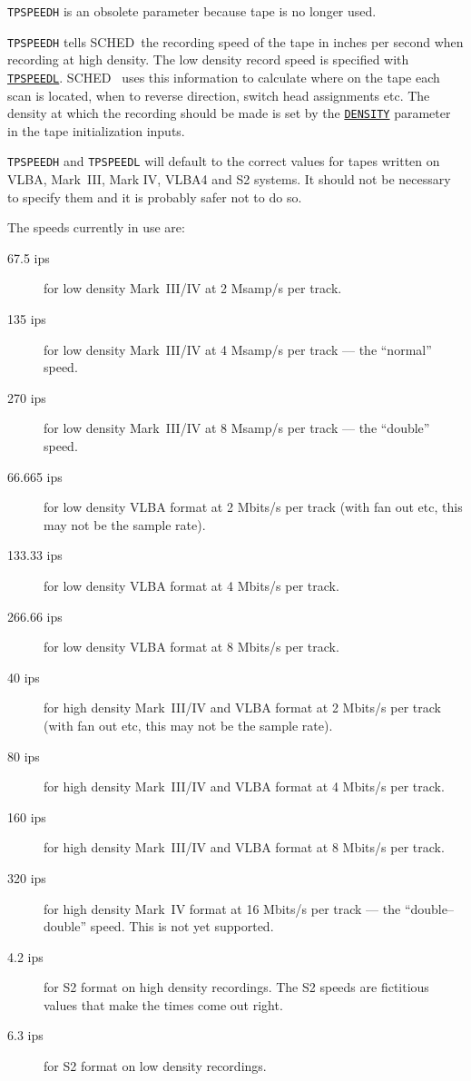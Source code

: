 \documentclass{report}
\newcommand{\schedb}{{\sc SCHED~}}
\begin{document}
{\tt TPSPEEDH} is an obsolete parameter because tape is no longer used.

{\tt TPSPEEDH} tells \schedb the recording speed of the tape in inches
per second when recording at high density.  The low density record
speed is specified with 
{\hyperref[SP:TPSPEEDL]{{\tt TPSPEEDL}}}. \schedb
uses this information to calculate where on the tape each scan is
located, when to reverse direction, switch head assignments etc.  The
density at which the recording should be made is set by the
{\hyperref[TP:DENSITY]{{\tt DENSITY}}} parameter in the tape
initialization inputs.

{\tt TPSPEEDH} and {\tt TPSPEEDL} will default to the correct values
for tapes written on VLBA, Mark~III, Mark IV, VLBA4 and S2 systems.  It
should not be necessary to specify them and it is probably safer not
to do so.

The speeds currently in use are:

\begin{description}
\item[67.5 ips] for low density Mark~III/IV at 2 Msamp/s per track.
\item[135 ips] for low density Mark~III/IV at 4 Msamp/s per track ---
               the ``normal'' speed.
\item[270 ips] for low density Mark~III/IV at 8 Msamp/s per track ---
               the ``double'' speed.
\item[66.665 ips] for low density VLBA format at 2 Mbits/s per track
               (with fan out etc, this may not be the sample rate).
\item[133.33 ips] for low density VLBA format at 4 Mbits/s per track.
\item[266.66 ips] for low density VLBA format at 8 Mbits/s per track.
\item[40 ips] for high density Mark~III/IV and VLBA format at 2 Mbits/s
               per track (with fan out etc, this may not be the
               sample rate).
\item[80 ips] for high density Mark~III/IV and VLBA format at 4 Mbits/s
              per track.
\item[160 ips] for high density Mark~III/IV and VLBA format at 8 Mbits/s
              per track.
\item[320 ips] for high density Mark~IV format at 16 Mbits/s per
              track --- the ``double--double'' speed.  This is not
              yet supported.
\item[4.2 ips] for S2 format on high density recordings.  The S2
              speeds are fictitious values that make the times come
              out right.
\item[6.3 ips] for S2 format on low density recordings.
\end{description}
\end{document}
